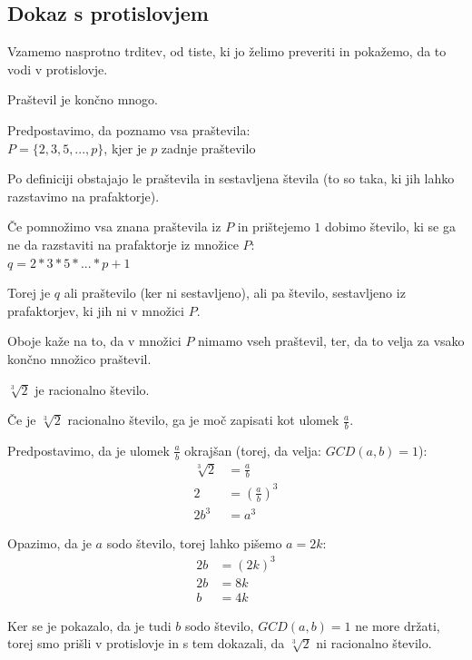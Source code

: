 \documentclass[10pt,a4paper,oneside]{book}
\begin{document}
\subsection{Dokaz s protislovjem}
Vzamemo nasprotno trditev, od tiste, ki jo želimo preveriti in pokažemo, da to vodi v protislovje.

\begin{primeri}
\item Praštevil je končno mnogo.
	\begin{items}
	\item Predpostavimo, da poznamo vsa praštevila:\\
		$P = \{2,3,5,...,p\}$, kjer je $p$ zadnje praštevilo 
	\item Po definiciji obstajajo le praštevila in sestavljena števila (to so taka, ki jih lahko razstavimo na prafaktorje). 
	\item Če pomnožimo vsa znana praštevila iz $P$ in prištejemo $1$ dobimo število, ki se ga ne da razstaviti na prafaktorje iz množice $P$:\\
		$q = 2 * 3 * 5 * ... * p + 1$
	\item Torej je $q$ ali praštevilo (ker ni sestavljeno), ali pa število, sestavljeno iz prafaktorjev, ki jih ni v množici $P$.
	\item Oboje kaže na to, da v množici $P$ nimamo vseh praštevil, ter, da to velja za vsako končno množico praštevil.
	\end{items}
\item $\sqrt[3]{2}$ je racionalno število.
	\begin{items}
	\item Če je $\sqrt[3]{2}$ racionalno število, ga je moč zapisati kot ulomek $\frac{a}{b}$.
	\item Predpostavimo, da je ulomek $\frac{a}{b}$ okrajšan (torej, da velja: $GCD(a,b)=1$):
		\begin{align*}
		\sqrt[3]{2} &= \frac{a}{b}\\
		2 &= \left( \frac{a}{b} \right)^3\\
		2b^3 &= a^3
		\end{align*}
	\item Opazimo, da je $a$ sodo število, torej lahko pišemo $a = 2k$:
		\begin{align*}
		2b &= \left( 2k\right)^3\\
		2b &= 8k\\
		b &= 4k
		\end{align*}
	\item Ker se je pokazalo, da je tudi $b$ sodo število, $GCD(a,b)=1$ ne more držati, torej smo prišli v protislovje in s tem dokazali, da $\sqrt[3]{2}$ ni racionalno število.
	\end{items}
\end{primeri}
\end{document}
